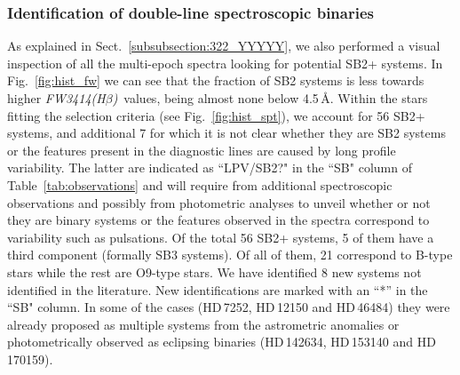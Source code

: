 \documentclass{aa}
\newcommand{\fwhb}{\textit{FW3414(H$\beta$)}}
\begin{document}

\subsubsection{Identification of double-line spectroscopic binaries}
\label{subsubsection:424_XXXXX}

As explained in Sect.~\ref{subsubsection:322_YYYYY}, we also performed a visual inspection of all the multi-epoch spectra looking for potential SB2+ systems. In Fig.~\ref{fig:hist_fw} we can see that the fraction of SB2 systems is less towards higher \fwhb\ values, being almost none below 4.5\,\AA. Within the stars fitting the selection criteria (see Fig.~\ref{fig:hist_spt}), we account for 56 SB2+ systems, and additional 7 for which it is not clear whether they are SB2 systems or the features present in the diagnostic lines are caused by long profile variability. The latter are indicated as ``LPV/SB2?" in the ``SB" column of Table~\ref{tab:observations} and will require from additional spectroscopic observations and possibly from photometric analyses to unveil whether or not they are binary systems or the features observed in the spectra correspond to variability such as pulsations. Of the total 56 SB2+ systems, 5 of them have a third component (formally SB3 systems). Of all of them, 21 correspond to B-type stars while the rest are O9-type stars. We have identified 8 new systems not identified in the literature. New identifications are marked with an ``*'' in the ``SB" column. In some of the cases (HD\,7252, HD\,12150 and HD\,46484) they were already proposed as multiple systems from the astrometric anomalies \citep{2019A&A...623A..72K} or photometrically observed as eclipsing binaries (HD\,142634, HD\,153140 and HD\,170159). 
\end{document}
